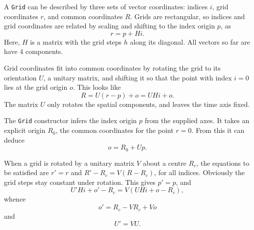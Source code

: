 A {\tt Grid} can be described by three sets of vector coordinates: indices $i$, grid coordinates $r$, and common coordinates $R$.  Grids are rectangular, so indices and grid coordinates are related by scaling and shifting to the index origin $p$, as
$$r=p+Hi.$$
Here, $H$ is a matrix with the grid steps $h$ along its diagonal.  All vectors so far are have 4 components.

Grid coordinates fit into common coordinates by rotating the grid to its orientation $U$, a unitary matrix, and shifting it so that the point with index $i=0$ lies at the grid origin $o$.  This looks like
$$R=U(r-p)+o=UHi+o.$$
The matrix $U$ only rotates the spatial components, and leaves the time axis fixed.

The {\tt Grid} constructor infers the index origin $p$ from the supplied axes.  It takes an explicit origin $R_0$, the common coordinates for the point $r=0$.  From this it can deduce
$$o=R_0+Up.$$

When a grid is rotated by a unitary matrix $V$ about a centre $R_c$, the equations to be satisfied are $r'=r$ and $R'-R_c=V(R-R_c)$, for all indices.  Obviously the grid steps stay constant under rotation.  This gives $p'=p$, and
$$U'Hi+o'-R_c=V(UHi+o-R_c),$$
whence
$$o'=R_c-VR_c+Vo$$
and
$$U'=VU.$$



\bye